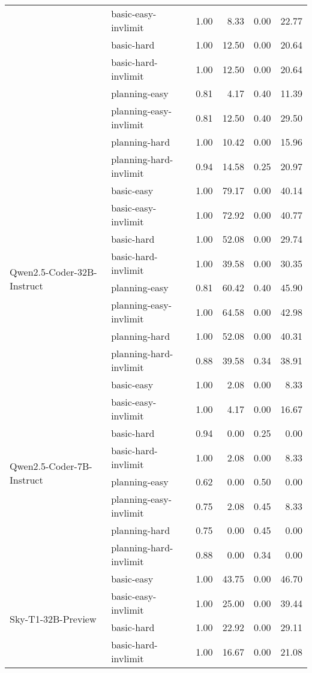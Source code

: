\begin{tabular}{llrrrr}
 & basic-easy-invlimit & 1.00 & 8.33 & 0.00 & 22.77 \\
 & basic-hard & 1.00 & 12.50 & 0.00 & 20.64 \\
 & basic-hard-invlimit & 1.00 & 12.50 & 0.00 & 20.64 \\
 & planning-easy & 0.81 & 4.17 & 0.40 & 11.39 \\
 & planning-easy-invlimit & 0.81 & 12.50 & 0.40 & 29.50 \\
 & planning-hard & 1.00 & 10.42 & 0.00 & 15.96 \\
 & planning-hard-invlimit & 0.94 & 14.58 & 0.25 & 20.97 \\
\cline{1-6}
\multirow[c]{8}{*}{Qwen2.5-Coder-32B-Instruct} & basic-easy & 1.00 & 79.17 & 0.00 & 40.14 \\
 & basic-easy-invlimit & 1.00 & 72.92 & 0.00 & 40.77 \\
 & basic-hard & 1.00 & 52.08 & 0.00 & 29.74 \\
 & basic-hard-invlimit & 1.00 & 39.58 & 0.00 & 30.35 \\
 & planning-easy & 0.81 & 60.42 & 0.40 & 45.90 \\
 & planning-easy-invlimit & 1.00 & 64.58 & 0.00 & 42.98 \\
 & planning-hard & 1.00 & 52.08 & 0.00 & 40.31 \\
 & planning-hard-invlimit & 0.88 & 39.58 & 0.34 & 38.91 \\
\cline{1-6}
\multirow[c]{8}{*}{Qwen2.5-Coder-7B-Instruct} & basic-easy & 1.00 & 2.08 & 0.00 & 8.33 \\
 & basic-easy-invlimit & 1.00 & 4.17 & 0.00 & 16.67 \\
 & basic-hard & 0.94 & 0.00 & 0.25 & 0.00 \\
 & basic-hard-invlimit & 1.00 & 2.08 & 0.00 & 8.33 \\
 & planning-easy & 0.62 & 0.00 & 0.50 & 0.00 \\
 & planning-easy-invlimit & 0.75 & 2.08 & 0.45 & 8.33 \\
 & planning-hard & 0.75 & 0.00 & 0.45 & 0.00 \\
 & planning-hard-invlimit & 0.88 & 0.00 & 0.34 & 0.00 \\
\cline{1-6}
\multirow[c]{8}{*}{Sky-T1-32B-Preview} & basic-easy & 1.00 & 43.75 & 0.00 & 46.70 \\
 & basic-easy-invlimit & 1.00 & 25.00 & 0.00 & 39.44 \\
 & basic-hard & 1.00 & 22.92 & 0.00 & 29.11 \\
 & basic-hard-invlimit & 1.00 & 16.67 & 0.00 & 21.08 \\

\end{tabular}
